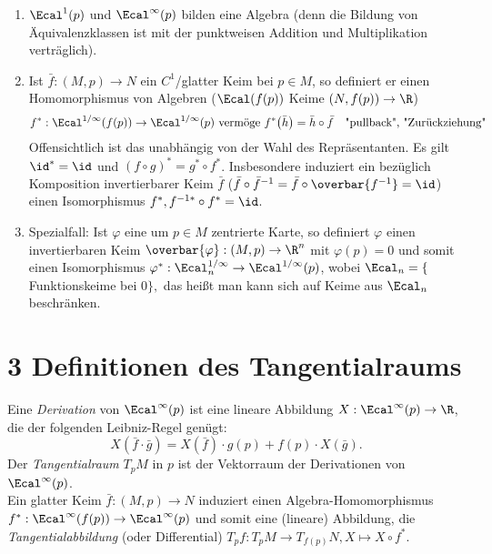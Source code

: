 \begin{rem}
	\begin{enumerate}[label={\roman*})]
		\item $\Ecal^1(p)$ und $\Ecal^\infty(p)$ bilden eine Algebra (denn die Bildung von Äquivalenzklassen ist mit der punktweisen Addition und Multiplikation verträglich).
		\item Ist $ \bar{f}: (M,p)\to N $ ein $C^1$/glatter Keim bei $p \in M$, so definiert er einen Homomorphismus von Algebren \big($\Ecal(f(p))$ Keime $(N,f(p)) \to \R$\big)
		\[ f^*: \Ecal^{1/\infty} (f(p)) \to \Ecal^{1/\infty} (p) \ \text{vermöge } f^* \big( \bar{h} \big) = \bar{h} \circ \bar{f} \quad \text{"pullback", "Zurückziehung"} \]
		Offensichtlich ist das unabhängig von der Wahl des Repräsentanten.
		Es gilt $\id^* = \id$ und $(f \circ g)^* = g^* \circ f^*$. Insbesondere induziert ein bezüglich Komposition invertierbarer Keim $\bar{f}$ ($ \bar{f} \circ \bar{f}^{-1} = \bar{f} \circ \overbar{f^{-1}} = \id $) einen Isomorphismus $f^*, f^{-1 *} \circ f^* = \id$.
		\item Spezialfall: Ist $\varphi$ eine um $p \in M$ zentrierte Karte, so definiert $\varphi$ einen invertierbaren Keim $ \overbar{\varphi}: (M,p) \to \R^n $ mit $\varphi(p)=0$ und somit einen Isomorphismus $ \varphi^*: \Ecal^{1/\infty}_n \to \Ecal^{1/\infty} (p) $, wobei $ \Ecal_n = \{$Funktionskeime bei $0 \}, $ das heißt man kann sich auf Keime aus $\Ecal_n$ beschränken.
	\end{enumerate}
\end{rem}

\section{3 Definitionen des Tangentialraums}

\begin{defn}
	Eine \emph{Derivation} von $\Ecal^\infty(p)$ ist eine lineare Abbildung $X: \Ecal^\infty(p) \to \R$, die der folgenden Leibniz-Regel genügt:
	\[ X(\bar{f} \cdot \bar{g}) = X(\bar{f}) \cdot g(p) + f(p) \cdot X(\bar{g}). \]
	Der \emph{Tangentialraum} $T_pM$ in $p$ ist der Vektorraum der Derivationen von $\Ecal^\infty(p)$.\\
	Ein glatter Keim $ \bar{f}: (M,p) \to N $ induziert einen Algebra-Homomorphismus $ f^*: \Ecal^\infty (f(p)) \to \Ecal^\infty (p) $ und somit eine (lineare) Abbildung, die \emph{Tangentialabbildung} (oder Differential) $ T_pf: T_pM \to T_{f(p)}N, X \mapsto X \circ f^*. $
\end{defn}

